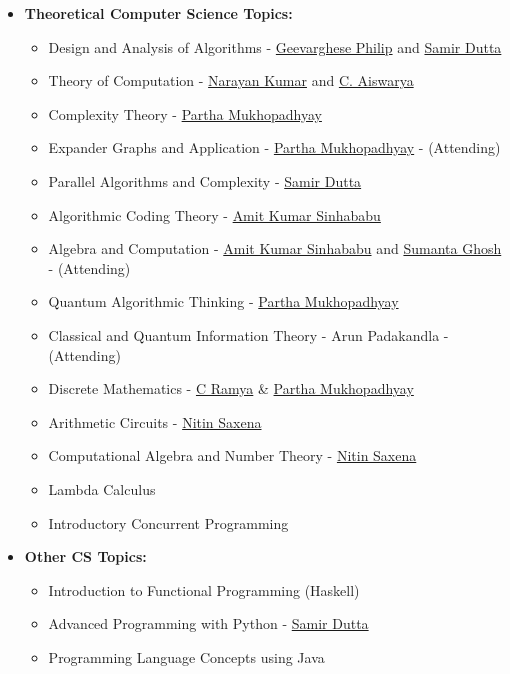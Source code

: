 \documentclass[10pt,a4paper,sans,colorlinks]{moderncv}        %
\begin{document}
\begin{itemize}
\begin{itemize}
\item \textbf{Theoretical Computer Science Topics:} \begin{itemize}
\item Design and Analysis of Algorithms - \href{https://www.cmi.ac.in/~gphilip/}{Geevarghese Philip} and \href{https://www.cmi.ac.in/~sdatta/}{Samir Dutta}
\item Theory of Computation - \href{https://www.cmi.ac.in/~kumar/}{Narayan Kumar} and \href{https://www.cmi.ac.in/~aiswarya/}{C. Aiswarya}
\item Complexity Theory - \href{https://www.cmi.ac.in/~partham/}{Partha Mukhopadhyay}
\item Expander Graphs and Application - \href{https://www.cmi.ac.in/~partham/}{Partha Mukhopadhyay} - (Attending)
\item Parallel Algorithms and Complexity - \href{https://www.cmi.ac.in/~sdatta/}{Samir Dutta}
\item Algorithmic Coding Theory - \href{https://www.cmi.ac.in/people/fac-profile.php?id=amitks}{Amit Kumar Sinhababu}
\item Algebra and Computation - \href{https://www.cmi.ac.in/people/fac-profile.php?id=amitks}{Amit Kumar Sinhababu} and \href{https://sites.google.com/view/sumghosh/home}{Sumanta Ghosh} - (Attending)
\item Quantum Algorithmic Thinking - \href{https://www.cmi.ac.in/~partham/}{Partha Mukhopadhyay}
\item Classical and Quantum Information Theory - Arun Padakandla - (Attending)
\item Discrete Mathematics - \href{https://sites.google.com/cse.iitm.ac.in/c-ramya}{C Ramya} \& \href{https://www.cmi.ac.in/~partham/}{Partha Mukhopadhyay}
\item Arithmetic Circuits - \href{https://www.cse.iitk.ac.in/users/nitin/}{Nitin Saxena}
\item Computational Algebra and Number Theory - \href{https://www.cse.iitk.ac.in/users/nitin/}{Nitin Saxena}
\item Lambda Calculus
\item Introductory Concurrent Programming
		            \end{itemize}
		            \vspace*{5mm}
		      \item \textbf{Other CS Topics:} \begin{itemize}
			            \item Introduction to Functional Programming (Haskell)
			            \item Advanced Programming with Python - \href{https://www.cmi.ac.in/~sdatta/}{Samir Dutta}
			            \item Programming Language Concepts using Java
		            \end{itemize}

	      \end{itemize}

\end{itemize}
\end{document}
